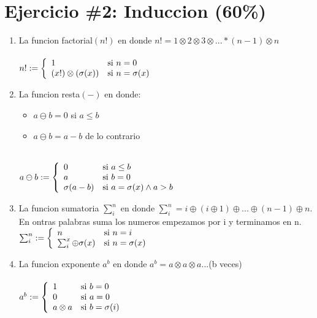 \documentclass{article}
\begin{document}
\section*{Ejercicio \#2: Induccion (60\%)}
\begin{enumerate}
        \item{La funcion factorial$(n!)$ en donde $n!= 1\otimes 2\otimes 3\otimes...\ast (n-1)\otimes n  $} \\
         \\
\(
n! := \left\{
 \begin{array}{l l}
            1 & \mbox{si } n=0 \\
            (x!)\otimes (\sigma(x)) & \mbox{si } n= \sigma(x) \\
        \end{array}
        \right.
\) \\
        \item{La funcion resta$(-)$ en donde:
        \begin{itemize}
         \item{$a\ominus b = 0$ si $a\leq b$ }
          \item{$a\ominus b = a -b$ de lo contrario}
          \end{itemize}
        }\\
        
 \(
a\ominus b := \left\{
 \begin{array}{l l}
            0 & \mbox{si } a\leq b \\
            a & \mbox{si } b= 0 \\
            \sigma(a-b) & \mbox{si } a =\sigma(x)\wedge a>b \\
        \end{array}
        \right.
\) \\
        
         \item{La funcion sumatoria $\sum_{i}^{n}$ en donde $\sum_{i}^{n}= i\oplus (i\oplus 1)\oplus ...\oplus(n-1)\oplus n.$ En ontras palabras suma los numeros empezamos por i y terminamos en n.}\\
         
          \(
\sum_{i}^{n} := \left\{
 \begin{array}{l l}
            n & \mbox{si } n = i \\
           \sum_{i}^{x}\oplus \sigma(x) & \mbox{si } n= \sigma(x) \\
        \end{array}
        \right.
\) \\
         \item{La funcion exponente $a^b$ en donde $a^b= a\otimes a\otimes a...$(b veces)} \\
          \\
\(
a^b := \left\{
 \begin{array}{l l}
            1 & \mbox{si } b = 0 \\
            0 & \mbox{si } a = 0 \\ 
            a\otimes a & \mbox{si } b = \sigma(i) \\
        \end{array}
        \right.
\) \\
      

\end{enumerate}
\end{document}
